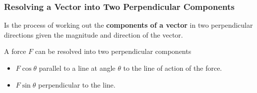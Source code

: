 \subsubsection*{Resolving a Vector into Two Perpendicular Components}

Is the process of working out the \textbf{components of a vector} in two perpendicular directions given the magnitude and direction of the vector.

A force $F$ can be resolved into two perpendicular components
\begin{itemize}
    \item $F\cos\theta$ parallel to a line at angle $\theta$ to the line of action of the force.
    \item $F\sin\theta$ perpendicular to the line.
\end{itemize}
